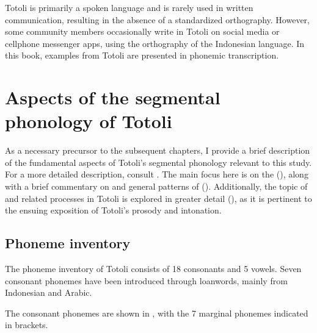 Totoli is primarily a spoken language and is rarely used in written communication, resulting in the absence of a standardized orthography. However, some community members occasionally write in Totoli on social media or cellphone messenger apps, using the orthography of the Indonesian language. In this book, examples from Totoli are presented in phonemic transcription.

\section[Segmental Phonology]{Aspects of the segmental phonology of Totoli}


As a necessary precursor to the subsequent chapters, I provide a brief description of the fundamental aspects of Totoli's segmental phonology relevant to this study. For a more detailed description, consult \citet{bracksphonol}. The main focus here  is on the  (), along with a brief commentary on  and general patterns of  (). Additionally, the topic of  and related processes in Totoli is explored in greater detail  (), as it is pertinent to the ensuing exposition of Totoli's prosody and intonation.

\subsection{Phoneme inventory}
\label{subsection: Phneme inventory}


The phoneme inventory of Totoli consists of 18 consonants and 5 vowels. Seven consonant phonemes have been introduced through loanwords, mainly from Indonesian and Arabic.



The consonant phonemes are shown in  , with the 7 marginal phonemes  indicated in brackets.



